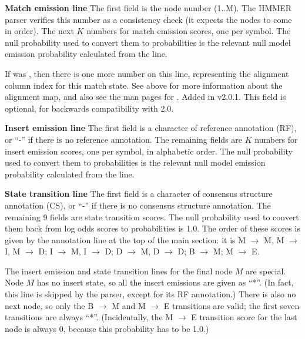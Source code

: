 \begin{wideitem}

\item [\textbf{Match emission line}] The first field is the node number (1..M).
The HMMER parser verifies this number as a consistency check (it
expects the nodes to come in order). The next $K$ numbers for match
emission scores, one per symbol. The null probability used to convert
them to probabilities is the relevant null model emission probability
calculated from the  line.

If  was , then there is one more number on this
line, representing the alignment column index for this match state.
See  above for more information about the alignment map, and
also see the man pages for .  Added in
v2.0.1. This field is optional, for backwards compatibility with 2.0.

\item [\textbf{Insert emission line}] The first field is a character of
reference annotation (RF), or ``-'' if there is no reference
annotation. The remaining fields are $K$ numbers for insert emission
scores, one per symbol, in alphabetic order. The null probability used
to convert them to probabilities is the relevant null model emission
probability calculated from the  line.

\item [\textbf{State transition line}] The first field is a character
of consensus structure annotation (CS), or ``-'' if there is no
consensus structure annotation. The remaining 9 fields are state
transition scores. The null probability used to convert them back from
log odds scores to probabilities is 1.0. The order of these scores is
given by the annotation line at the top of the main section: it is M
$\rightarrow$ M, M $\rightarrow$ I, M $\rightarrow$ D; I $\rightarrow$
M, I $\rightarrow$ D; D $\rightarrow$ M, D $\rightarrow$ D; B
$\rightarrow$ M; M $\rightarrow$ E.

\end{wideitem}

The insert emission and state transition lines for the final node $M$
are special.  Node $M$ has no insert state, so all the insert
emissions are given as ``*''. (In fact, this line is skipped by the
parser, except for its RF annotation.) There is also no next node, so
only the B $\rightarrow$ M and M $\rightarrow$ E transitions are
valid; the first seven transitions are always ``*''.  (Incidentally,
the M $\rightarrow$ E transition score for the last node is always 0,
because this probability has to be 1.0.)

